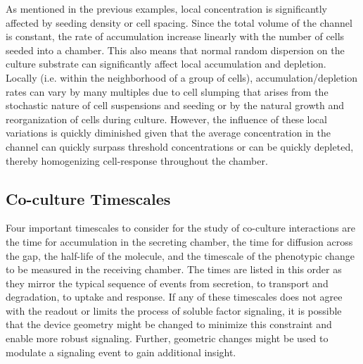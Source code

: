 As mentioned in the previous examples, local concentration is significantly affected by seeding density or cell spacing. Since the total volume of the channel is constant, the rate of accumulation increase linearly with the number of cells seeded into a chamber. This also means that normal random dispersion on the culture substrate can significantly affect local accumulation and depletion. Locally (i.e. within the neighborhood of a group of cells), accumulation\slash depletion rates can vary by many multiples due to cell slumping that arises from the stochastic nature of cell suspensions and seeding or by the natural growth and reorganization of cells during culture. However, the influence of these local variations is quickly diminished given that the average concentration in the channel can quickly surpass threshold concentrations or can be quickly depleted, thereby homogenizing cell-response throughout the chamber.

\subsection{Co-culture Timescales}

Four important timescales to consider for the study of co-culture interactions are the time for accumulation in the secreting chamber, the time for diffusion across the gap, the half-life of the molecule, and the timescale of the phenotypic change to be measured in the receiving chamber. The times are listed in this order as they mirror the typical sequence of events from secretion, to transport and degradation, to uptake and response. If any of these timescales does not agree with the readout or limits the process of soluble factor signaling, it is possible that the device geometry might be changed to minimize this constraint and enable more robust signaling. Further, geometric changes might be used to modulate a signaling event to gain additional insight.

